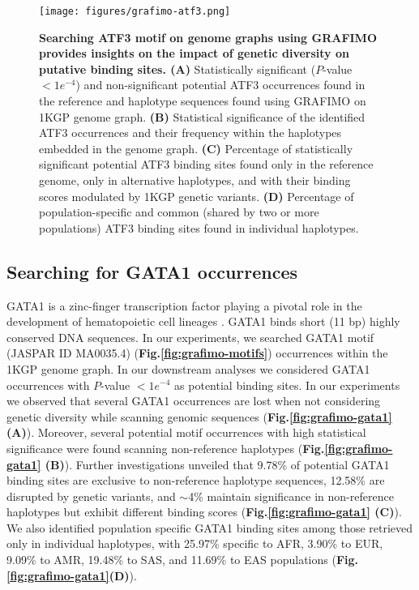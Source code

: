 \documentclass[a4paper, titlepage, openright]{book}
\newcommand{\grafimo}{GRAFIMO\xspace}
\begin{document}
\begin{figure}
    \centering
    \texttt{[image: figures/grafimo-atf3.png]}
    \caption[Searching ATF3 motif on genome graphs using \grafimo provides insights on the impact of genetic diversity on putative binding sites]{\textbf{Searching ATF3 motif on genome graphs using \grafimo provides insights on the impact of genetic diversity on putative binding sites. (A)} Statistically significant ($P$-value $< 1e^{-4}$) and non-significant potential ATF3 occurrences found in the reference and haplotype sequences found using \grafimo on 1KGP genome graph. \textbf{(B)} Statistical significance of the identified ATF3 occurrences and their frequency within the haplotypes embedded in the genome graph. \textbf{(C)} Percentage of statistically significant potential ATF3 binding sites found only in the reference genome, only in alternative haplotypes, and with their binding scores modulated by 1KGP genetic variants. \textbf{(D)} Percentage of population-specific and common (shared by two or more populations) ATF3 binding sites found in individual haplotypes.}
    \label{fig:grafimo-atf3}
\end{figure}

\subsection{Searching for GATA1 occurrences}
GATA1 is a zinc-finger transcription factor playing a pivotal role in the development of hematopoietic cell lineages \citep{calligaris1995alternative}. GATA1 binds short (11 bp) highly conserved DNA sequences. In our experiments, we searched GATA1 motif (JASPAR ID MA0035.4) (\textbf{Fig.\ref{fig:grafimo-motifs}}) occurrences within the 1KGP genome graph. In our downstream analyses we considered GATA1 occurrences with $P$-value $< 1e^{-4}$ as potential binding sites. In our experiments we observed that several GATA1 occurrences are lost when not considering genetic diversity while scanning genomic sequences (\textbf{Fig.\ref{fig:grafimo-gata1} (A)}). Moreover, several potential motif occurrences with high statistical significance were found scanning non-reference haplotypes (\textbf{Fig.\ref{fig:grafimo-gata1} (B)}). Further investigations unveiled that 9.78\% of potential GATA1 binding sites are exclusive to non-reference haplotype sequences, 12.58\% are disrupted by genetic variants, and $\sim$4\% maintain significance in non-reference haplotypes but exhibit different binding scores (\textbf{Fig.\ref{fig:grafimo-gata1} (C)}). We also identified population specific GATA1 binding sites among those retrieved only in individual haplotypes, with 25.97\% specific to AFR, 3.90\% to EUR, 9.09\% to AMR, 19.48\% to SAS, and 11.69\% to EAS populations (\textbf{Fig.\ref{fig:grafimo-gata1}(D)}).
\end{document}
